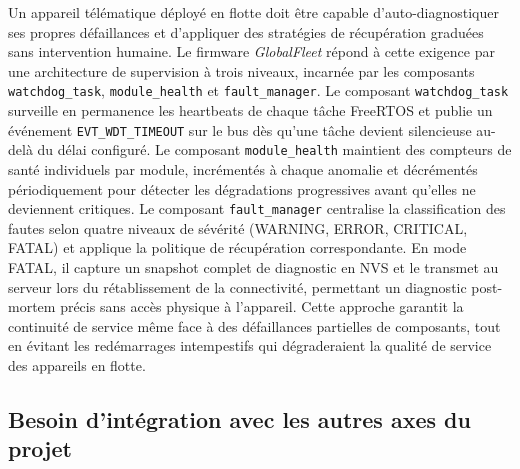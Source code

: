 Un appareil télématique déployé en flotte doit être capable
d'auto-diagnostiquer ses propres défaillances et d'appliquer des
stratégies de récupération graduées sans intervention humaine.
Le firmware \textit{GlobalFleet} répond à cette exigence par une
architecture de supervision à trois niveaux, incarnée par les
composants \texttt{watchdog\_task}, \texttt{module\_health} et
\texttt{fault\_manager}. Le composant \texttt{watchdog\_task}
surveille en permanence les heartbeats de chaque tâche FreeRTOS et
publie un événement \texttt{EVT\_WDT\_TIMEOUT} sur le bus dès qu'une
tâche devient silencieuse au-delà du délai configuré. Le composant
\texttt{module\_health} maintient des compteurs de santé individuels
par module, incrémentés à chaque anomalie et décrémentés
périodiquement pour détecter les dégradations progressives avant
qu'elles ne deviennent critiques. Le composant \texttt{fault\_manager}
centralise la classification des fautes selon quatre niveaux de
sévérité (WARNING, ERROR, CRITICAL, FATAL) et applique la politique
de récupération correspondante. En mode FATAL, il capture un snapshot
complet de diagnostic en NVS et le transmet au serveur lors du
rétablissement de la connectivité, permettant un diagnostic post-mortem
précis sans accès physique à l'appareil. Cette approche garantit la
continuité de service même face à des défaillances partielles de
composants, tout en évitant les redémarrages intempestifs qui
dégraderaient la qualité de service des appareils en flotte.

\subsection{Besoin d'intégration avec les autres axes du projet}
\label{subsec:besoin_integ}

